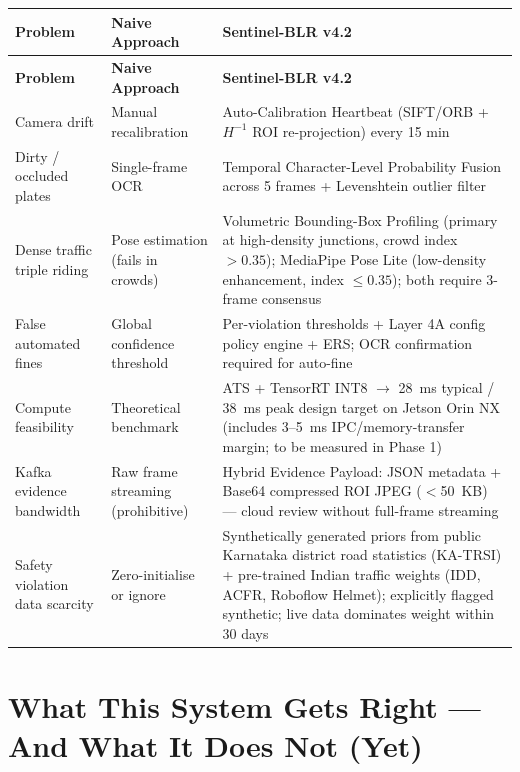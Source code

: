 \documentclass[11pt,a4paper]{article}
\begin{document}
\begin{longtable}{L{3.2cm} L{4.5cm} L{7cm}}
    \toprule
    \color{white}\textbf{Problem} & \color{white}\textbf{Naive Approach} & \color{white}\textbf{Sentinel-BLR v4.2} \\
    \midrule
    \endfirsthead
    \toprule
    \color{white}\textbf{Problem} & \color{white}\textbf{Naive Approach} & \color{white}\textbf{Sentinel-BLR v4.2} \\
    \midrule
    \endhead
    \bottomrule
    \endfoot

    Camera drift & Manual recalibration & Auto-Calibration Heartbeat (SIFT/ORB + $H^{-1}$ ROI re-projection) every 15 min \\
    Dirty / occluded plates & Single-frame OCR & Temporal Character-Level Probability Fusion across 5 frames + Levenshtein outlier filter \\
    Dense traffic triple riding & Pose estimation (fails in crowds) & Volumetric Bounding-Box Profiling (primary at high-density junctions, crowd index $> 0.35$); MediaPipe Pose Lite (low-density enhancement, index $\leq 0.35$); both require 3-frame consensus \\
    False automated fines & Global confidence threshold & Per-violation thresholds + Layer 4A config policy engine + ERS; OCR confirmation required for auto-fine \\
    Compute feasibility & Theoretical benchmark & ATS + TensorRT INT8 $\rightarrow$ 28~ms typical / 38~ms peak design target on Jetson Orin NX (includes 3--5~ms IPC/memory-transfer margin; to be measured in Phase 1) \\
    Kafka evidence bandwidth & Raw frame streaming (prohibitive) & Hybrid Evidence Payload: JSON metadata + Base64 compressed ROI JPEG ($<$50~KB) — cloud review without full-frame streaming \\
    Safety violation data scarcity & Zero-initialise or ignore & Synthetically generated priors from public Karnataka district road statistics (KA-TRSI) + pre-trained Indian traffic weights (IDD, ACFR, Roboflow Helmet); explicitly flagged synthetic; live data dominates weight within 30 days \\
\end{longtable}

\section{What This System Gets Right — And What It Does Not (Yet)}
\end{document}
